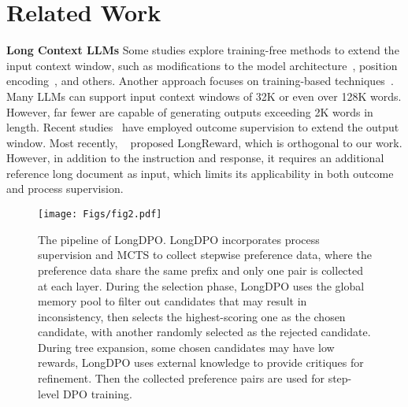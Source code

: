 \section{Related Work}
\textbf{Long Context LLMs} Some studies explore training-free methods to extend the input context window, such as modifications to the model architecture~\citep{DBLP:conf/iclr/PengQFS24,DBLP:conf/iclr/XiaoTCHL24}, position encoding~\citep{DBLP:conf/icml/DingZZXSX0Y24,xiao2024duoattentionefficientlongcontextllm}, and others. Another approach focuses on training-based techniques~\citep{bai-etal-2024-longalign,munkhdalai2024leavecontextbehindefficient,DBLP:conf/icml/FuPNYHK024}. Many LLMs can support input context windows of 32K or even over 128K words. However, far fewer are capable of generating outputs exceeding 2K words in length. Recent studies~\citep{DBLP:conf/emnlp/PhamSI24,bai2024longwriterunleashing10000word} have employed outcome supervision to extend the output window. Most recently, ~\citet{zhang2024longrewardimprovinglongcontextlarge} proposed LongReward, which is orthogonal to our work. However, in addition to the instruction and response, it requires an additional reference long document as input, which limits its applicability in both outcome and process supervision.



\begin{figure*}[ht]
  \centering
  \texttt{[image: Figs/fig2.pdf]}
  \caption{
The pipeline of LongDPO. LongDPO incorporates process supervision and MCTS to collect stepwise preference data, where the preference data share the same prefix and only one pair is collected at each layer. During the selection phase, LongDPO uses the global memory pool to filter out candidates that may result in inconsistency, then selects the highest-scoring one as the chosen candidate, with another randomly selected as the rejected candidate. During tree expansion, some chosen candidates may have low rewards, LongDPO uses external knowledge to provide critiques for refinement. Then the collected preference pairs are used for step-level DPO training. 
  }
  \label{fig2}
\end{figure*}


